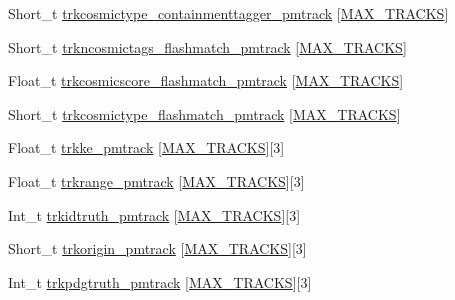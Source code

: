 \begin{DoxyCompactItemize}
\item 
Short\-\_\-t \hyperlink{classanatree_a93f811617f430448d8b39f7c5329d09e}{trkcosmictype\-\_\-containmenttagger\-\_\-pmtrack} \mbox{[}\hyperlink{anatree__core__v09410002_8h_a327fd4e796e4a0d78947524c96e4362e}{M\-A\-X\-\_\-\-T\-R\-A\-C\-K\-S}\mbox{]}
\item 
Short\-\_\-t \hyperlink{classanatree_a611c36f3d47daa5400da697ca9c4da77}{trkncosmictags\-\_\-flashmatch\-\_\-pmtrack} \mbox{[}\hyperlink{anatree__core__v09410002_8h_a327fd4e796e4a0d78947524c96e4362e}{M\-A\-X\-\_\-\-T\-R\-A\-C\-K\-S}\mbox{]}
\item 
Float\-\_\-t \hyperlink{classanatree_a0d7f1227e5a1cc04e53bec32972760a1}{trkcosmicscore\-\_\-flashmatch\-\_\-pmtrack} \mbox{[}\hyperlink{anatree__core__v09410002_8h_a327fd4e796e4a0d78947524c96e4362e}{M\-A\-X\-\_\-\-T\-R\-A\-C\-K\-S}\mbox{]}
\item 
Short\-\_\-t \hyperlink{classanatree_a142fa7ffc0bf06b4afd54da839cf7032}{trkcosmictype\-\_\-flashmatch\-\_\-pmtrack} \mbox{[}\hyperlink{anatree__core__v09410002_8h_a327fd4e796e4a0d78947524c96e4362e}{M\-A\-X\-\_\-\-T\-R\-A\-C\-K\-S}\mbox{]}
\item 
Float\-\_\-t \hyperlink{classanatree_a356f241fe10ef56e6176bae32d45a35e}{trkke\-\_\-pmtrack} \mbox{[}\hyperlink{anatree__core__v09410002_8h_a327fd4e796e4a0d78947524c96e4362e}{M\-A\-X\-\_\-\-T\-R\-A\-C\-K\-S}\mbox{]}\mbox{[}3\mbox{]}
\item 
Float\-\_\-t \hyperlink{classanatree_aea6afedcdbcb8d214b59f011942cbe21}{trkrange\-\_\-pmtrack} \mbox{[}\hyperlink{anatree__core__v09410002_8h_a327fd4e796e4a0d78947524c96e4362e}{M\-A\-X\-\_\-\-T\-R\-A\-C\-K\-S}\mbox{]}\mbox{[}3\mbox{]}
\item 
Int\-\_\-t \hyperlink{classanatree_a69032230d4731245f88a9082578f4263}{trkidtruth\-\_\-pmtrack} \mbox{[}\hyperlink{anatree__core__v09410002_8h_a327fd4e796e4a0d78947524c96e4362e}{M\-A\-X\-\_\-\-T\-R\-A\-C\-K\-S}\mbox{]}\mbox{[}3\mbox{]}
\item 
Short\-\_\-t \hyperlink{classanatree_a7cc04d8810c750538e720b7f681323ea}{trkorigin\-\_\-pmtrack} \mbox{[}\hyperlink{anatree__core__v09410002_8h_a327fd4e796e4a0d78947524c96e4362e}{M\-A\-X\-\_\-\-T\-R\-A\-C\-K\-S}\mbox{]}\mbox{[}3\mbox{]}
\item 
Int\-\_\-t \hyperlink{classanatree_a4039f571e1c27da177332399f30633b5}{trkpdgtruth\-\_\-pmtrack} \mbox{[}\hyperlink{anatree__core__v09410002_8h_a327fd4e796e4a0d78947524c96e4362e}{M\-A\-X\-\_\-\-T\-R\-A\-C\-K\-S}\mbox{]}\mbox{[}3\mbox{]}
\item 

\end{DoxyCompactItemize}
